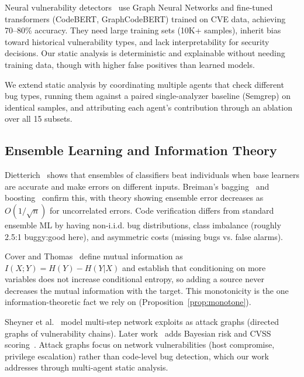 \documentclass[10pt,twocolumn]{article}
\begin{document}
Neural vulnerability detectors~\cite{ding2024vulnerability} use Graph Neural Networks and fine-tuned transformers (CodeBERT, GraphCodeBERT) trained on CVE data, achieving 70--80\% accuracy. They need large training sets (10K+ samples), inherit bias toward historical vulnerability types, and lack interpretability for security decisions. Our static analysis is deterministic and explainable without needing training data, though with higher false positives than learned models.

We extend static analysis by coordinating multiple agents that check different bug types, running them against a paired single-analyzer baseline (Semgrep) on identical samples, and attributing each agent's contribution through an ablation over all 15 subsets.

\subsection{Ensemble Learning and Information Theory}

Dietterich~\cite{dietterich2000ensemble} shows that ensembles of classifiers beat individuals when base learners are accurate and make errors on different inputs. Breiman's bagging~\cite{breiman1996bagging} and boosting~\cite{schapire1990boosting} confirm this, with theory showing ensemble error decreases as $O(1/\sqrt{n})$ for uncorrelated errors. Code verification differs from standard ensemble ML by having non-i.i.d. bug distributions, class imbalance (roughly 2.5:1 buggy:good here), and asymmetric costs (missing bugs vs. false alarms).

Cover and Thomas~\cite{cover2006information} define mutual information as $I(X; Y) = H(Y) - H(Y|X)$ and establish that conditioning on more variables does not increase conditional entropy, so adding a source never decreases the mutual information with the target. This monotonicity is the one information-theoretic fact we rely on (Proposition~\ref{prop:monotone}).

Sheyner et al.~\cite{sheyner2002attack} model multi-step network exploits as attack graphs (directed graphs of vulnerability chains). Later work~\cite{bayesian2018attack} adds Bayesian risk and CVSS scoring~\cite{cvss2024}. Attack graphs focus on network vulnerabilities (host compromise, privilege escalation) rather than code-level bug detection, which our work addresses through multi-agent static analysis.

\end{document}

